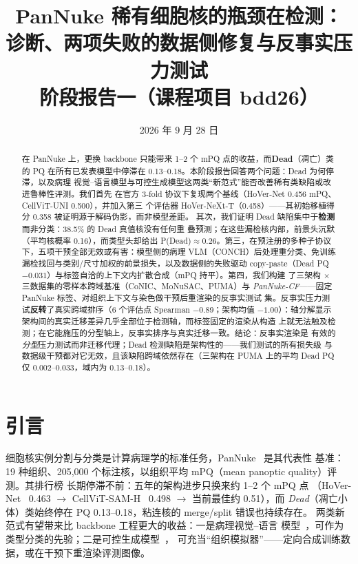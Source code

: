 \documentclass[11pt]{article}
\title{\bfseries PanNuke 稀有细胞核的瓶颈在检测：\\
诊断、两项失败的数据侧修复与反事实压力测试\\[6pt]
\large 阶段报告一（课程项目 bdd26）}
\author{}
\date{2026 年 9 月 28 日}
\begin{document}
\maketitle

\begin{abstract}
在 PanNuke 上，更换 backbone 只能带来 1--2 个 mPQ 点的收益，而\textbf{Dead}（凋亡）类
的 PQ 在所有已发表模型中停滞在 0.13--0.18。本阶段报告回答两个问题：Dead 为何停滞，以及病理
视觉--语言模型与可控生成模型这两类“新范式”能否改善稀有类缺陷或改进鲁棒性评测。我们首先
在官方 3-fold 协议下复现两个基线（HoVer-Net 0.456 mPQ、CellViT-UNI 0.500），并加入第三
个评估器 HoVer-NeXt-T（0.458）——其初始移植得分 0.358 被证明源于解码伪影，而非模型差距。
其次，我们证明 Dead 缺陷集中于\textbf{检测}而非分类：38.5\% 的 Dead 真值核没有任何重
叠预测；在这些漏检核内部，前景头沉默（平均核概率 0.16），而类型头却给出
P(Dead)$\approx$0.26。第三，在预注册的多种子协议下，五项干预全部无效或有害：模型侧的病理
VLM（CONCH）后处理重分类、免训练漏检找回与类别/尺寸加权的前景损失，以及数据侧的失败驱动
copy-paste（Dead PQ $-0.031$）与标签自洽的上下文内扩散合成（mPQ 持平）。第四，我们构建
了三架构 $\times$ 三数据集的零样本跨域基准（CoNIC、MoNuSAC、PUMA）与
\emph{PanNuke-CF}——固定 PanNuke 标签、对组织上下文与染色做干预后重渲染的反事实测试
集。反事实压力测试\textbf{反转}了真实跨域排序（6 个评估点 Spearman $-0.89$；架构均值
$-1.00$）：轴分解显示架构间的真实迁移差异几乎全部位于检测轴，而标签固定的渲染从构造
上就无法触及检测；在它能施压的分型轴上，反事实排序与真实迁移一致。结论：反事实渲染是
有效的\emph{分型}压力测试而非迁移代理；Dead 检测缺陷是架构性的——我们测试的所有损失级
与数据级干预都对它无效，且该缺陷跨域依然存在（三架构在 PUMA 上的平均 Dead PQ 仅
0.002--0.033，域内为 0.13--0.18）。
\end{abstract}

\section{引言}
\label{sec:intro}

细胞核实例分割与分类是计算病理学的标准任务，PanNuke~\cite{gamper2019pannuke} 是其代表性
基准：19 种组织、205,000 个标注核，以组织平均 mPQ（mean panoptic quality）评测。其排行榜
长期停滞不前：五年的架构进步只换来约 1--2 个 mPQ 点
（HoVer-Net~\cite{graham2019hovernet} 0.463 $\rightarrow$
CellViT-SAM-H~\cite{horta2024cellvit} 0.498 $\rightarrow$ 当前最佳约 0.51），而
\emph{Dead}（凋亡小体）类始终停在 PQ 0.13--0.18，粘连核的 merge/split 错误也持续存在。
两类新范式有望带来比 backbone 工程更大的收益：一是病理视觉--语言
模型~\cite{lu2024conch}，可作为类型分类的先验；二是可控生成模型~\cite{le2025pixcell}，
可充当“组织模拟器”——定向合成训练数据，或在干预下重渲染评测图像。
\end{document}
